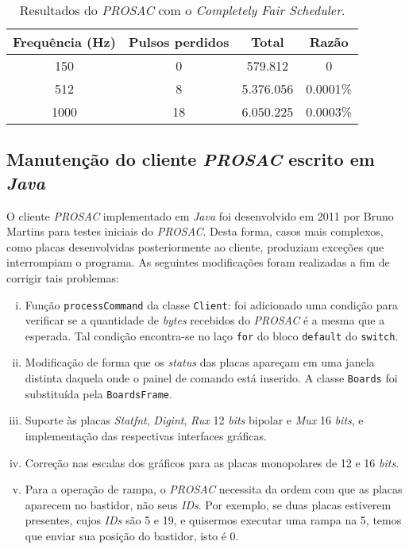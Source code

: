 \begin{table}[h]

	\centering
	\caption{\label{tab:prosac} Resultados do \textit{PROSAC} com o
	\textit{Completely Fair Scheduler}.}
	\begin{tabular}{| c | c | c | c |}
		\hline
		\textbf{Frequência (Hz)} & \textbf{Pulsos perdidos} & \textbf{Total} &
		\textbf{Razão} \\ \hline 
		150 & 0 & 579.812  & 0 \\ \hline
		512 & 8 & 5.376.056 & 0.0001\% \\ \hline
		1000 & 18 & 6.050.225 & 0.0003\% \\ \hline
	\end{tabular}	    
\end{table}
 
 
\subsection {Manutenção do cliente \textit{PROSAC} escrito em \textit{Java}}

O cliente \textit{PROSAC} implementado em \textit{Java} foi desenvolvido em 2011
por Bruno Martins para testes iniciais do \textit{PROSAC}. Desta forma, casos mais
complexos, como placas desenvolvidas posteriormente ao cliente, produziam
exceções que interrompiam o programa. As seguintes modificações foram realizadas
a fim de corrigir tais problemas:

\begin {enumerate} [i.] 
  \item Função \texttt{processCommand} da classe \texttt{Client}: foi adicionado
  uma condição para verificar se a quantidade de \textit{bytes} recebidos do
  \textit{PROSAC} é a mesma que a esperada. Tal condição encontra-se no laço
  \texttt{for} do bloco \texttt{default} do \texttt{switch}.

  \item Modificação de forma que os \textit{status} das placas apareçam em uma
  janela distinta daquela onde o painel de comando está inserido. A classe
  \texttt{Boards} foi substituída pela \texttt{BoardsFrame}.
  
  \item Suporte às placas \textit{Statfnt}, \textit{Digint}, \textit{Rux} 12
  \textit{bits} bipolar e \textit{Mux} 16 \textit{bits}, e implementação das
  respectivas interfaces gráficas.

  \item Correção nas escalas dos gráficos para as placas monopolares de 12 e 16
  \textit{bits}.
  
  \item Para a operação de rampa, o \textit{PROSAC} necessita da ordem com que
  as placas aparecem no bastidor, não seus \textit{IDs}. Por exemplo, se duas
  placas estiverem presentes, cujos \textit{IDs} são 5 e 19, e quisermos
  executar uma rampa na 5, temos que enviar sua posição do bastidor, isto é 0.

\end{enumerate}

